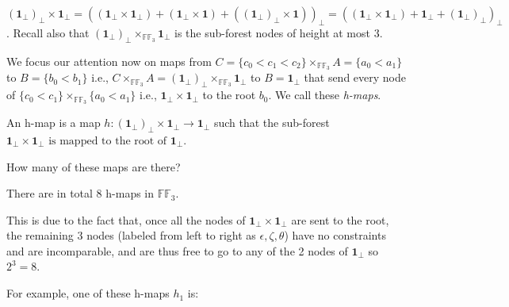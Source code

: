 \begin{remark} 
	$(\textbf{1}_\bot)_\bot \times \textbf{1}_\bot = ( (\textbf{1}_\bot \times \textbf{1}_\bot) + (\textbf{1}_\bot \times \textbf{1}) + ( (\textbf{1}_\bot)_\bot \times \textbf{1} ))_\bot = ( (\textbf{1}_\bot \times \textbf{1}_\bot) + \textbf{1}_\bot +  (\textbf{1}_\bot)_\bot)_\bot$. Recall also that $(\textbf{1}_\bot)_\bot \times_{\mathbb{FF}_3} \textbf{1}_\bot$ is the sub-forest nodes of height at most 3.
\end{remark}
\newpage
We focus our attention now on maps from $C=\{c_0 < c_1 < c_2\} \times_{\mathbb{FF}_3} A=\{a_0 < a_1\}$ to $B= \{b_0 < b_1\}$ i.e., $C \times_{\mathbb{FF}_3} A = (\textbf{1}_\bot)_\bot \times_{\mathbb{FF}_3} \textbf{1}_\bot$ to $B = \textbf{1}_\bot$  that send every node of $\{c_0 < c_1 \} \times_{\mathbb{FF}_3} \{a_0 < a_1\}$ i.e., $\textbf{1}_\bot \times \textbf{1}_\bot$ to the root $b_0$.
We call these \emph{h-maps}.
\begin{definition}
	An h-map is a map $h:  (\textbf{1}_\bot)_\bot \times \textbf{1}_\bot \rightarrow \textbf{1}_\bot$ such that the sub-forest $\textbf{1}_\bot \times \textbf{1}_\bot  \text{ is mapped to the root of } \textbf{1}_\bot$.
\end{definition}

How many of these maps are there?

\begin{lem}
	There are in total 8 h-maps in $\mathbb{FF}_3$. 
\end{lem}

This is due to the fact that, once all the nodes of $\textbf{1}_\bot \times \textbf{1}_\bot$ are sent to the root, the remaining 3 nodes (labeled from left to right as $\epsilon,\zeta,\theta$) have no constraints and are incomparable, and are thus free to go to any of the 2 nodes of $\textbf{1}_\bot$ so $2^3=8$.
\newline

For example, one of these h-maps $h_1$ is:

